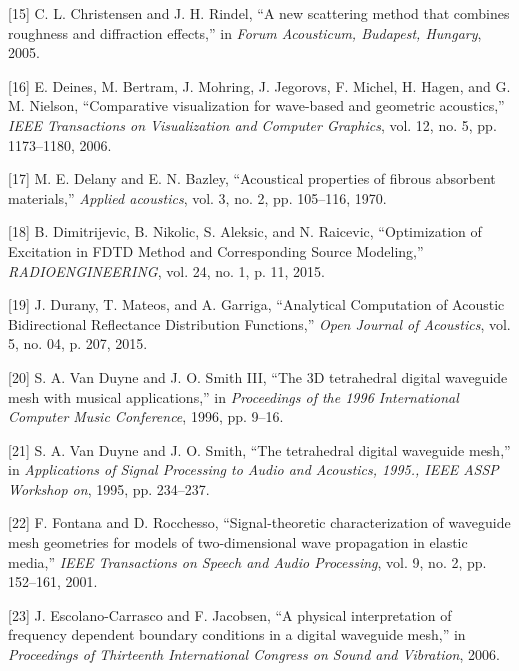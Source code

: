\documentclass[]{scrreprt}
\begin{document}
\hypertarget{ref-christensenux5fnewux5f2005}{}
{[}15{]} C. L. Christensen and J. H. Rindel, ``A new scattering method
that combines roughness and diffraction effects,'' in \emph{Forum
Acousticum, Budapest, Hungary}, 2005.

\hypertarget{ref-deinesux5fcomparativeux5f2006}{}
{[}16{]} E. Deines, M. Bertram, J. Mohring, J. Jegorovs, F. Michel, H.
Hagen, and G. M. Nielson, ``Comparative visualization for wave-based and
geometric acoustics,'' \emph{IEEE Transactions on Visualization and
Computer Graphics}, vol. 12, no. 5, pp. 1173--1180, 2006.

\hypertarget{ref-delanyux5facousticalux5f1970}{}
{[}17{]} M. E. Delany and E. N. Bazley, ``Acoustical properties of
fibrous absorbent materials,'' \emph{Applied acoustics}, vol. 3, no. 2,
pp. 105--116, 1970.

\hypertarget{ref-dimitrijevicux5foptimizationux5f2015}{}
{[}18{]} B. Dimitrijevic, B. Nikolic, S. Aleksic, and N. Raicevic,
``Optimization of Excitation in FDTD Method and Corresponding Source
Modeling,'' \emph{RADIOENGINEERING}, vol. 24, no. 1, p. 11, 2015.

\hypertarget{ref-duranyux5fanalyticalux5f2015}{}
{[}19{]} J. Durany, T. Mateos, and A. Garriga, ``Analytical Computation
of Acoustic Bidirectional Reflectance Distribution Functions,''
\emph{Open Journal of Acoustics}, vol. 5, no. 04, p. 207, 2015.

\hypertarget{ref-vanux5fduyneux5f3dux5f1996}{}
{[}20{]} S. A. Van Duyne and J. O. Smith III, ``The 3D tetrahedral
digital waveguide mesh with musical applications,'' in \emph{Proceedings
of the 1996 International Computer Music Conference}, 1996, pp. 9--16.

\hypertarget{ref-vanux5fduyneux5ftetrahedralux5f1995}{}
{[}21{]} S. A. Van Duyne and J. O. Smith, ``The tetrahedral digital
waveguide mesh,'' in \emph{Applications of Signal Processing to Audio
and Acoustics, 1995., IEEE ASSP Workshop on}, 1995, pp. 234--237.

\hypertarget{ref-fontanaux5fsignal-theoreticux5f2001}{}
{[}22{]} F. Fontana and D. Rocchesso, ``Signal-theoretic
characterization of waveguide mesh geometries for models of
two-dimensional wave propagation in elastic media,'' \emph{IEEE
Transactions on Speech and Audio Processing}, vol. 9, no. 2, pp.
152--161, 2001.

\hypertarget{ref-escolano-carrascoux5fphysicalux5f2006}{}
{[}23{]} J. Escolano-Carrasco and F. Jacobsen, ``A physical
interpretation of frequency dependent boundary conditions in a digital
waveguide mesh,'' in \emph{Proceedings of Thirteenth International
Congress on Sound and Vibration}, 2006.
\end{document}
